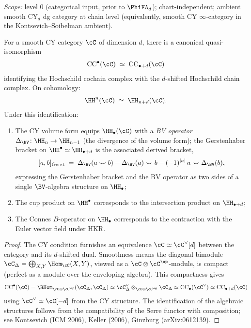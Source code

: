 \begin{theorem}
\label{thm:cy-hh-duality}
\textsl{Scope:} level $0$ (categorical input, prior to $\PhiFA_d$);
chart-independent; ambient smooth CY$_d$ dg category at chain level
(equivalently, smooth CY $\infty$-category in the
Kontsevich--Soibelman ambient).

For a smooth CY category $\cC$ of dimension $d$, there is a
canonical quasi-isomorphism
\[
 \mathrm{CC}^\bullet(\cC)
 \;\simeq\;
 \mathrm{CC}_{\bullet + d}(\cC)
\]
identifying the Hochschild cochain complex with the $d$-shifted
Hochschild chain complex. On cohomology:
\[
 \HH^n(\cC) \;\simeq\; \HH_{n+d}(\cC).
\]
Under this identification:
\begin{enumerate}[label=(\roman*)]
 \item The CY volume form equips $\HH_\bullet(\cC)$ with a \emph{BV operator} $\Delta_{\BV} \colon \HH_{n} \to \HH_{n-1}$ (the divergence of the volume form); the Gerstenhaber bracket on $\HH^\bullet \simeq \HH_{\bullet + d}$ is the associated derived bracket,
 \[
 [a, b]_{\mathrm{Gerst}} \;=\; \Delta_{\BV}(a \smile b) - \Delta_{\BV}(a) \smile b - (-1)^{|a|}\, a \smile \Delta_{\BV}(b),
 \]
 expressing the Gerstenhaber bracket and the BV operator as two sides of a single $\BV$-algebra structure on $\HH_\bullet$;
 \item The cup product on $\HH^\bullet$ corresponds to the
 intersection product on $\HH_{\bullet+d}$;
 \item The Connes $B$-operator on $\HH_\bullet$ corresponds to
 the contraction with the Euler vector field under HKR.
\end{enumerate}
\end{theorem}

\begin{proof}
The CY condition furnishes an equivalence $\cC \simeq \cC^\vee[d]$
between the category and its $d$-shifted dual. Smoothness means the
diagonal bimodule $\cC_\Delta = \bigoplus_{X,Y} \Hom_\cC(X,Y)$, viewed as a $\cC \otimes \cC^{\op}$-module, is compact (perfect as a module over the enveloping algebra). This compactness gives
\[
 \mathrm{CC}^\bullet(\cC)
 = \RHom_{\cC \otimes \cC^{\op}}(\cC_\Delta, \cC_\Delta)
 \simeq \cC_\Delta^\vee \otimes_{\cC \otimes \cC^{\op}} \cC_\Delta
 \simeq \mathrm{CC}_\bullet(\cC^\vee)
 \simeq \mathrm{CC}_{\bullet + d}(\cC)
\]
using $\cC^\vee \simeq \cC[-d]$ from the CY structure. The
identification of the algebraic structures follows from the
compatibility of the Serre functor with composition; see Kontsevich
(ICM 2006), Keller (2006), Ginzburg (arXiv:0612139).
\end{proof}


